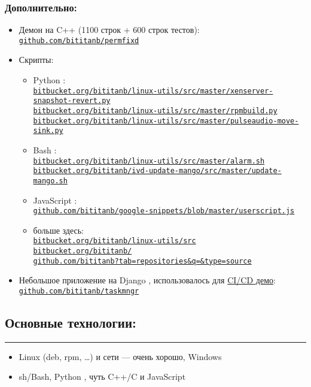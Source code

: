 \documentclass[11pt, a4paper]{article}
\newcommand{\Delimitline}{
  \vspace{-4ex}
  \textcolor[RGB]{120,120,120}{\rule{\linewidth}{1pt}}
  \vspace{-4ex}
}
\newcommand\rurl[1]{%
  \href{http://#1}{\nolinkurl{#1}}%
}
\newcommand\Eng[1]{%
  \foreignlanguage{english}{#1}%
}
\begin{document}
\subsubsection*{Дополнительно:}
\begin{itemize}
  \item Демон на \Eng{C++} (1100 строк + 600 строк тестов):\\
    \rurl{github.com/bititanb/permfixd}
  \item Скрипты:
    \begin{itemize}
      \item \Eng{Python}:\\
        \rurl{bitbucket.org/bititanb/linux-utils/src/master/xenserver-snapshot-revert.py}\\
        \rurl{bitbucket.org/bititanb/linux-utils/src/master/rpmbuild.py}\\
        \rurl{bitbucket.org/bititanb/linux-utils/src/master/pulseaudio-move-sink.py}
      \item \Eng{Bash}:\\
        \rurl{bitbucket.org/bititanb/linux-utils/src/master/alarm.sh}\\
        \rurl{bitbucket.org/bititanb/ivd-update-mango/src/master/update-mango.sh}
      \item \Eng{JavaScript}:\\
        \rurl{github.com/bititanb/google-snippets/blob/master/userscript.js}
      \item больше здесь:\\
        \rurl{bitbucket.org/bititanb/linux-utils/src}\\
        \rurl{bitbucket.org/bititanb/}\\
        \rurl{github.com/bititanb?tab=repositories&q=&type=source}
    \end{itemize}
  \item Небольшое приложение на \Eng{Django}, использовалось для \href{https://github.com/bititanb/CI-CD-pipeline}{\Eng{CI/CD} демо}:\\
    \rurl{github.com/bititanb/taskmngr}
\end{itemize}

\subsection*{Основные технологии:}
\Delimitline
\begin{itemize}
  \item \Eng{Linux (deb, rpm, \dots)} и сети — очень хорошо, \Eng{Windows}
  \item \Eng{sh/Bash, Python}, чуть \Eng{C++/C} и \Eng{JavaScript}
\end{itemize}
\end{document}
